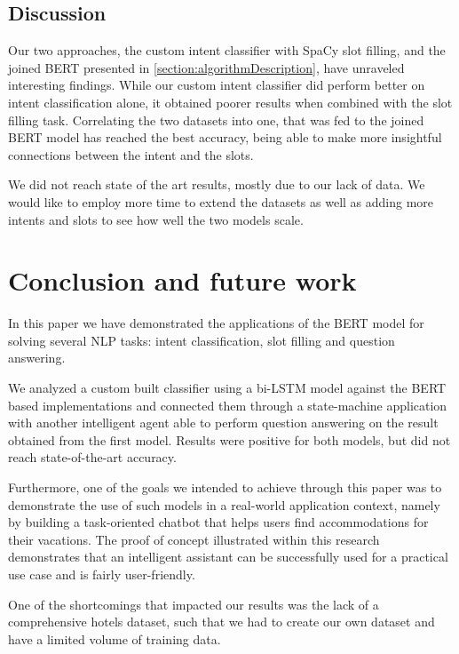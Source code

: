 \documentclass[runningheads,a4paper,11pt]{report}
\begin{document}
\section{Discussion}
\label{section:discussion}

Our two approaches, the custom intent classifier with SpaCy slot filling, and the joined BERT presented in \ref{section:algorithmDescription}, have unraveled interesting findings. While our custom intent classifier did perform better on intent classification alone, it obtained poorer results when combined with the slot filling task. Correlating the two datasets into one, that was fed to the joined BERT model has reached the best accuracy, being able to make more insightful connections between the intent and the slots. 

We did not reach state of the art results, mostly due to our lack of data. We would like to employ more time to extend the datasets as well as adding more intents and slots to see how well the two models scale.


\chapter{Conclusion and future work}
\label{chapter:concl}

In this paper we have demonstrated the applications of the BERT model for solving several NLP tasks: intent classification, slot filling and question answering. 

We analyzed a custom built classifier using a bi-LSTM model against the BERT based implementations and connected them through a state-machine application with another intelligent agent able to perform question answering on the result obtained from the first model. Results were positive for both models, but did not reach state-of-the-art accuracy. 

Furthermore, one of the goals we intended to achieve through this paper was to demonstrate the use of such models in a real-world application context, namely by building a task-oriented chatbot that helps users find accommodations for their vacations. The proof of concept illustrated within this research demonstrates that an intelligent assistant can be successfully used for a practical use case and is fairly user-friendly.

One of the shortcomings that impacted our results was the lack of a comprehensive hotels dataset, such that we had to create our own dataset and have a limited volume of training data.
\end{document}
